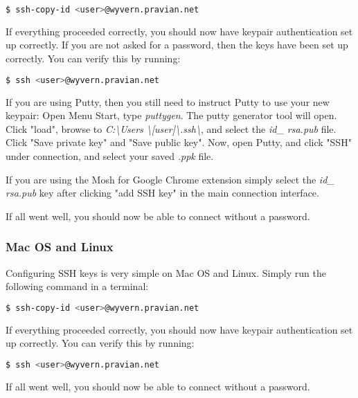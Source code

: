\documentclass[a4paper]{article}
\begin{document}
\begin{appendices}
\begin{lstlisting}[language=bash]
$ ssh-copy-id <user>@wyvern.pravian.net
\end{lstlisting}

If everything proceeded correctly, you should now have keypair authentication set up correctly. If you are not asked for a password, then the keys have been set up correctly. You can verify this by running:

\begin{lstlisting}[language=bash]
$ ssh <user>@wyvern.pravian.net
\end{lstlisting}

If you are using Putty, then you still need to instruct Putty to use your new keypair: Open Menu Start, type \textit{puttygen}. The putty generator tool will open. Click "load", browse to \textit{C:\textbackslash Users \textbackslash [user]\textbackslash .ssh\textbackslash}, and select the \textit{id\_ rsa.pub} file. Click "Save private key" and "Save public key". Now, open Putty, and click "SSH" under connection, and select your saved \textit{.ppk} file.

If you are using the Mosh for Google Chrome extension simply select the \textit{id\_ rsa.pub} key after clicking "add SSH key" in the main connection interface.

If all went well, you should now be able to connect without a password.

\subsubsection{Mac OS and Linux}
Configuring SSH keys is very simple on Mac OS and Linux. Simply run the following command in a terminal:

\begin{lstlisting}[language=bash]
$ ssh-copy-id <user>@wyvern.pravian.net
\end{lstlisting}

If everything proceeded correctly, you should now have keypair authentication set up correctly. You can verify this by running:

\begin{lstlisting}[language=bash]
$ ssh <user>@wyvern.pravian.net
\end{lstlisting}


If all went well, you should now be able to connect without a password.

\end{appendices}
\end{document}

